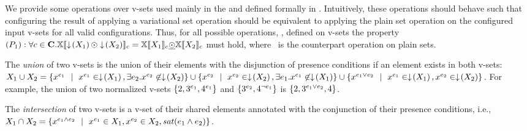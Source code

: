We provide some operations over v-sets used mainly in the  and defined
formally in . Intuitively, these operations should 
behave such that configuring the result of applying a variational set operation
should be equivalent to applying the plain set operation on the configured 
input v-sets for all valid configurations. 
%
Thus, for all possible operations, \vsetOp, defined on v-sets the property 
\ensuremath{
\Pone: \forall \config \in \confSet. \osetSem {\pushIn {\vset_1} \vsetOp \pushIn {\vset_2}} 
= \osetSem {\vset_1} \psetOp \osetSem {\vset_2}
} must hold, where \psetOp\ is the counterpart operation on plain sets.

%
\begin{definition}
\label{def:vset-union}
The \emph {union} of two v-sets is the union of their elements with the disjunction of 
presence conditions if an element exists in both v-sets:
\ensuremath{
\vset_1 \cup \vset_2 = \setDef {\annot [\dimMeta_1] \elem \myOR \annot [\dimMeta_1] \elem \in \pushIn {\vset_1}, \exists \dimMeta_2. \annot [\dimMeta_2] \elem \not \in \pushIn{\vset_2}}
\cup \setDef {\annot [\dimMeta_2] \elem \myOR \annot [\dimMeta_2] \elem \in \pushIn {\vset_2}, 
\exists \dimMeta_1. \annot [\dimMeta_1] \elem  \not \in \pushIn {\vset_1}}
\cup \setDef {\annot [\dimMeta_1 \vee \dimMeta_2] \elem \myOR 
\annot [\dimMeta_1] \elem \in \pushIn {\vset_1}, \annot [\dimMeta_2] \elem \in \pushIn {\vset_2}}
}.
For example, the union of two normalized v-sets
\ensuremath{\setDef {2,\annot [\dimMeta_1] 3, \annot [\dimMeta_1] 4}} and 
\ensuremath{\setDef {\annot [\dimMeta_2] 3, \annot [\neg \dimMeta_1] 4}} is
\ensuremath{
 \setDef {2, \annot [\dimMeta_1 \vee \dimMeta_2] 3, 4}
}.
\end{definition}

% 
\begin{definition}
\label{def:vset-intersect}
The \emph{intersection} of two v-sets is a v-set of their shared elements
annotated with the conjunction of their presence conditions, i.e., 
\ensuremath{
\vset_1 \cap \vset_2 = \setDef {
\annot [\dimMeta_1 \wedge \dimMeta_2 ]\elem \myOR
\annot [\dimMeta_1] \elem \in \vset_1, \annot [\dimMeta_2] \elem \in \vset_2,
\sat {\dimMeta_1 \wedge \dimMeta_2}
}
}.
\end{definition}

